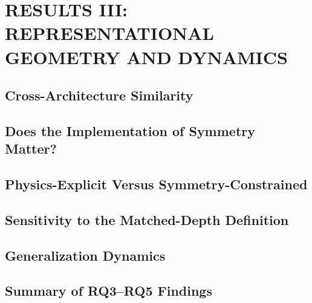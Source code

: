 \chapter{RESULTS III: REPRESENTATIONAL GEOMETRY AND DYNAMICS}
\label{ch:results-geometry}


\section{Cross-Architecture Similarity}
\section{Does the Implementation of Symmetry Matter?}
\section{Physics-Explicit Versus Symmetry-Constrained}
\section{Sensitivity to the Matched-Depth Definition}
\section{Generalization Dynamics}
\section{Summary of RQ3--RQ5 Findings}
